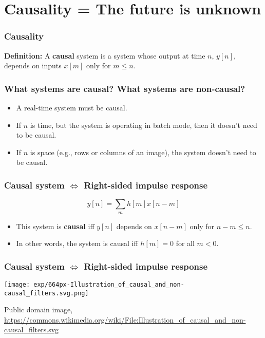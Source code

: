 \documentclass{beamer}
\begin{document}
\section[Causality]{Causality = The future is unknown}
\setcounter{subsection}{1}

\begin{frame}
  \frametitle{Causality}

  {\bf Definition:} A {\bf causal} system is a system whose output at
  time $n$, $y[n]$, depends on inputs $x[m]$ only for $m\le n$.
\end{frame}
  
\begin{frame}
  \frametitle{What systems are causal?  What systems are non-causal?}

  \begin{itemize}
  \item A real-time system must be causal.
  \item If $n$ is time, but the system is operating in batch mode,
    then it doesn't need to be causal.
  \item If $n$ is space (e.g., rows or columns of an image), the
    system doesn't need to be causal.
  \end{itemize}
\end{frame}

\begin{frame}
  \frametitle{Causal system $\Leftrightarrow$ Right-sided impulse response}

  \begin{displaymath}
    y[n] = \sum_m h[m]x[n-m]
  \end{displaymath}
  \begin{itemize}
    \item This system is {\bf causal} iff $y[n]$ depends on $x[n-m]$
      only for $n-m\le n$.
    \item In other words, the system is causal iff $h[m]=0$ for all $m<0$.
  \end{itemize}
\end{frame}

\begin{frame}
  \frametitle{Causal system $\Leftrightarrow$ Right-sided impulse response}

  \begin{center}
    \texttt{[image: exp/664px-Illustration\_of\_causal\_and\_non-causal\_filters.svg.png]}

    {\tiny Public domain image, \url{https://commons.wikimedia.org/wiki/File:Illustration_of_causal_and_non-causal_filters.svg}}
  \end{center}
\end{frame}
\end{document}
